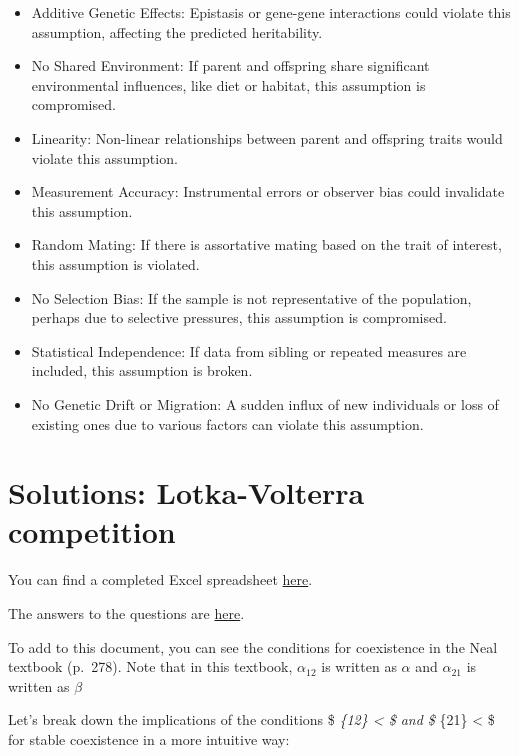 \documentclass[
  a4paper]{book}
\providecommand{\tightlist}{%
  \setlength{\itemsep}{0pt}\setlength{\parskip}{0pt}}
\begin{document}
\begin{itemize}
\tightlist
\item
  Additive Genetic Effects: Epistasis or gene-gene interactions could violate this assumption, affecting the predicted heritability.
\item
  No Shared Environment: If parent and offspring share significant environmental influences, like diet or habitat, this assumption is compromised.
\item
  Linearity: Non-linear relationships between parent and offspring traits would violate this assumption.
\item
  Measurement Accuracy: Instrumental errors or observer bias could invalidate this assumption.
\item
  Random Mating: If there is assortative mating based on the trait of interest, this assumption is violated.
\item
  No Selection Bias: If the sample is not representative of the population, perhaps due to selective pressures, this assumption is compromised.
\item
  Statistical Independence: If data from sibling or repeated measures are included, this assumption is broken.
\item
  No Genetic Drift or Migration: A sudden influx of new individuals or loss of existing ones due to various factors can violate this assumption.
\end{itemize}

\hypertarget{solutions-lotka-volterra-competition}{%
\section{Solutions: Lotka-Volterra competition}\label{solutions-lotka-volterra-competition}}

You can find a completed Excel spreadsheet \href{https://www.dropbox.com/s/q1qoqxhnm82uugw/9.\%20LV\%20Competition.xlsx?dl=1}{here}.

The answers to the questions are \href{https://www.dropbox.com/s/oz2c10bmyf8t7s6/9.\%20Answers\%20to\%20questions.pdf?dl=1}{here}.

To add to this document, you can see the conditions for coexistence in the Neal textbook (p.~278). Note that in this textbook, \(\alpha_{12}\) is written as \(\alpha\) and \(\alpha_{21}\) is written as \(\beta\)

Let's break down the implications of the conditions \$ \alpha\emph{\{12\} \textless{}  \$ and \$ \alpha}\{21\} \textless{}  \$ for stable coexistence in a more intuitive way:
\end{document}

